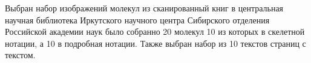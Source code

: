 Выбран набор изображений молекул из сканированный книг в центральная научная библиотека Иркутского научного центра Сибирского отделения Российской академии наук было собранно 20 молекул 10 из которых в скелетной нотации, а 10 в подробная нотации. Также выбран набор из 10 текстов страниц с текстом.    